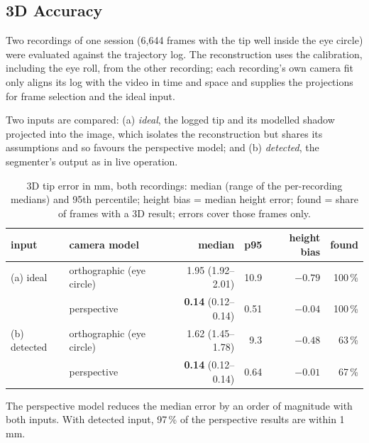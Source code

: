 
\subsection{3D Accuracy}
\label{sec:eval-3d}

Two recordings of one session (6,644 frames with the tip well inside the eye circle) were evaluated against the trajectory log. The reconstruction uses the calibration, including the eye roll, from the other recording; each recording's own
camera fit only aligns its log with the video in time and space and supplies the projections for frame selection and
the ideal input.

Two inputs are compared: (a) \emph{ideal}, the
logged tip and its modelled shadow projected into the image, which isolates the reconstruction but shares its
assumptions and so favours the perspective model; and (b) \emph{detected}, the segmenter's output as in live
operation.

\begin{table}[!htb]
  \centering
  \caption{3D tip error in mm, both recordings: median (range of the per-recording medians) and 95th percentile;
    height bias = median height error; found = share of frames with a 3D result; errors cover those frames only.}
  \label{tab:camera-accuracy}
  \small
  \begin{tabular}{llrrrr}
    \toprule
    input & camera model & median & p95 & height bias & found \\
    \midrule
    (a) ideal    & orthographic (eye circle)   & 1.95 (1.92--2.01) & 10.9 & $-0.79$ & 100\,\% \\
                 & perspective                 & \textbf{0.14} (0.12--0.14) & 0.51 & $-0.04$ & 100\,\% \\
    \midrule
    (b) detected & orthographic (eye circle)   & 1.62 (1.45--1.78) & 9.3  & $-0.48$ & 63\,\% \\
                 & perspective                 & \textbf{0.14} (0.12--0.14) & 0.64 & $-0.01$ & 67\,\% \\
    \bottomrule
  \end{tabular}
\end{table}

The perspective model reduces the median error by an order of magnitude with both inputs. With detected input, 97\,\% of the perspective results are within 1\,mm.


